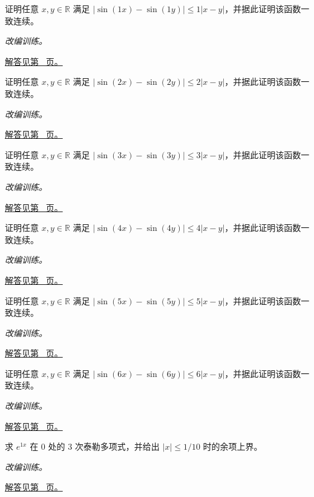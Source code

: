 \documentclass[UTF8,12pt,a4paper,fontset=fandol]{ctexart}
\begin{document}
\begin{example}[导数界转为函数差的界]\label{ex:c10q8}
证明任意 $x,y\in\mathbb R$ 满足 $|\sin(1x)-\sin(1y)|\le 1|x-y|$，并据此证明该函数一致连续。
\par\textit{改编训练。}\par\hyperref[ans:c10q8]{解答见第~\pageref{ans:c10q8} 页。}
\end{example}
\begin{example}[导数界转为函数差的界]\label{ex:c10q9}
证明任意 $x,y\in\mathbb R$ 满足 $|\sin(2x)-\sin(2y)|\le 2|x-y|$，并据此证明该函数一致连续。
\par\textit{改编训练。}\par\hyperref[ans:c10q9]{解答见第~\pageref{ans:c10q9} 页。}
\end{example}
\begin{example}[导数界转为函数差的界]\label{ex:c10q10}
证明任意 $x,y\in\mathbb R$ 满足 $|\sin(3x)-\sin(3y)|\le 3|x-y|$，并据此证明该函数一致连续。
\par\textit{改编训练。}\par\hyperref[ans:c10q10]{解答见第~\pageref{ans:c10q10} 页。}
\end{example}
\begin{example}[导数界转为函数差的界]\label{ex:c10q11}
证明任意 $x,y\in\mathbb R$ 满足 $|\sin(4x)-\sin(4y)|\le 4|x-y|$，并据此证明该函数一致连续。
\par\textit{改编训练。}\par\hyperref[ans:c10q11]{解答见第~\pageref{ans:c10q11} 页。}
\end{example}
\begin{example}[导数界转为函数差的界]\label{ex:c10q12}
证明任意 $x,y\in\mathbb R$ 满足 $|\sin(5x)-\sin(5y)|\le 5|x-y|$，并据此证明该函数一致连续。
\par\textit{改编训练。}\par\hyperref[ans:c10q12]{解答见第~\pageref{ans:c10q12} 页。}
\end{example}
\begin{example}[导数界转为函数差的界]\label{ex:c10q13}
证明任意 $x,y\in\mathbb R$ 满足 $|\sin(6x)-\sin(6y)|\le 6|x-y|$，并据此证明该函数一致连续。
\par\textit{改编训练。}\par\hyperref[ans:c10q13]{解答见第~\pageref{ans:c10q13} 页。}
\end{example}
\begin{example}[指数函数的泰勒多项式与余项]\label{ex:c10q14}
求 $e^{1x}$ 在 $0$ 处的 $3$ 次泰勒多项式，并给出 $|x|\le1/10$ 时的余项上界。
\par\textit{改编训练。}\par\hyperref[ans:c10q14]{解答见第~\pageref{ans:c10q14} 页。}
\end{example}
\end{document}
